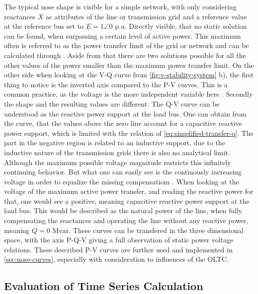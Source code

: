 The typical nose shape is visible for a simple network, with only considering reactances $X$ as attributes of the line or transmission grid and a reference value at the reference bus set to $\underline{E}=1\angle0$ p.u.
Directly visible, that no static solution can be found, when surpassing a certain level of active power. 
This maximum often is referred to as the power transfer limit of the grid or network and can be calculated through \label{eq:simplified-transfer-p}.
Aside from that there are two solutions possible for all the other values of the power smaller than the maximum power transfer limit.
On the other side when looking at the V-Q curve from \autoref{fig:v-stability-system} b), the first thing to notice is the inverted axis compared to the P-V curves.
This is a common practice, as the voltage is the more independent variable here \autocite{kundur_2022}.
Secondly the shape and the resulting values are different.
The Q-V curve can be understood as the reactive power support at the load bus.
One can obtain from the curve, that the values above the zero line account for a capacitive reactive power support, which is limited with the relation of \autoref{eq:simplified-transfer-q}.
The part in the negative region is related to an inductive support, due to the inductive nature of the transmission grids there is also no analytical limit.
Although the maximum possible voltage magnitude restricts this infinitely continuing behavior.
But what one can easily see is the continously increasing voltage in order to equalize the missing compensatiom \autocite{kundur_2022}.
When looking at the voltage of the maximum active power transfer, and reading the reactive power for that, one would see a positive, meaning capacitive reactive power support at the load bus.
This would be described as the natural power of the line, when fully compensating the reactances and operating the line without any reactive power, meaning $Q=0\text{ Mvar}$.
These curves can be transfered in the three dimensional space, with the axis P-Q-V giving a full observation of static power voltage relations.
These described P-V curves are further used and implemented in \autoref{sec:nose-curves}, especially with consideration to influences of the \acs{OLTC}.

\subsection{Evaluation of Time Series Calculation}
\label{sec:stability-indices}

